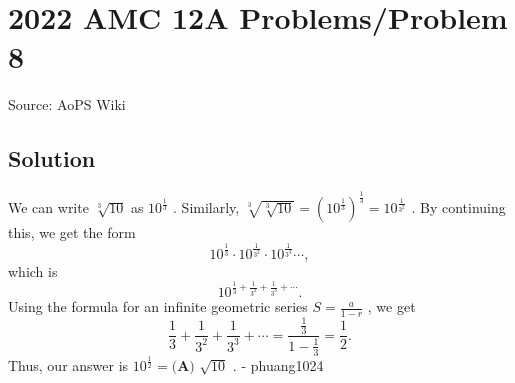 \documentclass[12pt]{article}
\begin{document}
\section*{{2022 AMC 12A Problems/Problem 8}}
Source: AoPS Wiki

\subsection*{Solution}
We can write $\sqrt[3]{10}$ as $10 ^ \frac{1}{3}$ . Similarly, $\sqrt[3]{\sqrt[3]{10}} = (10 ^ \frac{1}{3}) ^ \frac{1}{3} = 10 ^ \frac{1}{3^2}$ . By continuing this, we get the form \[10 ^ \frac{1}{3} \cdot 10 ^ \frac{1}{3^2} \cdot 10 ^ \frac{1}{3^3} \cdots,\] which is \[10 ^ {\frac{1}{3} + \frac{1}{3^2} + \frac{1}{3^3} + \cdots}.\] Using the formula for an infinite geometric series $S = \frac{a}{1-r}$ , we get \[\frac{1}{3} + \frac{1}{3^2} + \frac{1}{3^3} + \cdots = \frac{\frac{1}{3}}{1-\frac{1}{3}} = \frac{1}{2}.\] Thus, our answer is $10 ^ \frac{1}{2} = \boxed{\textbf{(A) }\sqrt{10}}$ . - phuang1024
\end{document}
